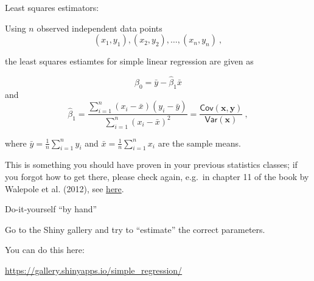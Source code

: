 \documentclass[10pt,ignorenonframetext,]{beamer}
\begin{document}
\begin{frame}

\begin{block}{Least squares estimators:}

\vspace{2mm}

Using \(n\) observed independent data points
\[(x_1,y_1), (x_2,y_2), \ldots, (x_n,y_n)\ ,\]

the least squares estiamtes for simple linear regression are given as

\begin{equation}\label{eq:beta0}
\hat{\beta}_0 = \bar{y}-\hat{\beta}_1 \bar{x}
\end{equation} and \begin{equation}\label{eq:beta1}
\hat{\beta}_1 = \frac{\sum_{i=1}^n(x_i-\bar{x})(y_i-\bar{y})}{\sum_{i=1}^n(x_i-\bar{x})^2} = \frac{\mathsf{Cov}(\boldsymbol{x},\boldsymbol{y})}{\mathsf{Var}(\boldsymbol{x})}\ ,
\end{equation}

\vspace{2mm}

where \(\bar{y} = \frac{1}{n} \sum_{i=1}^n y_i\) and
\(\bar{x} = \frac{1}{n}\sum_{i=1}^n x_i\) are the sample means.

\vspace{6mm}
\scriptsize

This is something you should have proven in your previous statistics
classes; if you forgot how to get there, please check again, e.g.~in
chapter 11 of the book by Walepole et al. (2012), see
\href{https://github.com/stefaniemuff/statlearning/blob/master/literature/Walepole_book.pdf}{here}.

\end{block}

\end{frame}

\begin{frame}

\begin{block}{Do-it-yourself ``by hand''}

\vspace{6mm}

Go to the Shiny gallery and try to ``estimate'' the correct parameters.
\vspace{2mm}

You can do this here: \vspace{2mm}

\url{https://gallery.shinyapps.io/simple_regression/}

\end{block}

\end{frame}
\end{document}
